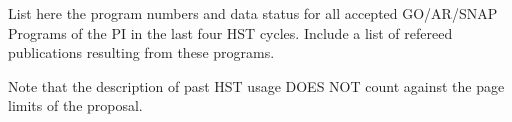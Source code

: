 \documentclass[12pt]{article}
\begin{document}

%
%
\duplications           %



%
%
%
\pasthstusage  %

    List here the program numbers and data status for all accepted GO/AR/SNAP Programs of the PI in the last four HST cycles. Include a list of refereed publications resulting from these programs.
       
    Note that the description of past HST usage DOES NOT count against the page limits of the proposal.


\end{document}
